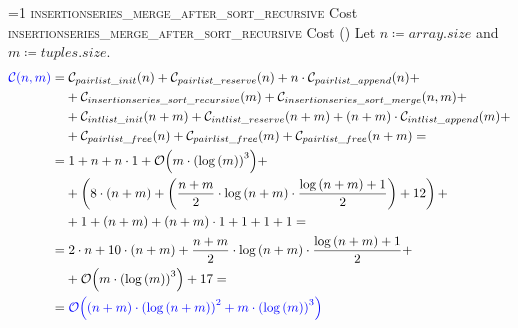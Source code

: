 \setcounter{insertionseriesmergeaftersortrecursivecostcounter}{1}
\newcommand{\insertionseriesmergeaftersortrecursivecostframe}{%
    \ifnum\value{insertionseriesmergeaftersortrecursivecostcounter}=1
        \textsc{insertionseries\_merge\_after\_sort\_recursive} Cost%
    \else
        \textsc{insertionseries\_merge\_after\_sort\_recursive} Cost (\theinsertionseriesmergeaftersortrecursivecostcounter)%
    \fi
}
        \begin{frame}{\insertionseriesmergeaftersortrecursivecostframe}
            \scriptsize
            Let $n \coloneqq array.size$ and $m \coloneqq tuples.size$.
            \begin{align*}
                \textcolor{blue}{\mathcal{C}{\left(n, m\right)}} = & \; \mathcal{C}_{pairlist\_init}{\left(n\right)} + \mathcal{C}_{pairlist\_reserve}{\left(n\right)} + n \cdot \mathcal{C}_{pairlist\_append}{\left(n\right)} + \\
                & + \mathcal{C}_{insertionseries\_sort\_recursive}{\left(m\right)} + \mathcal{C}_{insertionseries\_sort\_merge}{\left(n, m\right)} + \\
                & + \mathcal{C}_{intlist\_init}{\left(n + m\right)} + \mathcal{C}_{intlist\_reserve}{\left(n + m\right)} + \left(n + m\right) \cdot \mathcal{C}_{intlist\_append}{\left(m\right)} + \\
                & + \mathcal{C}_{pairlist\_free}{\left(n\right)} + \mathcal{C}_{pairlist\_free}{\left(m\right)} + \mathcal{C}_{pairlist\_free}{\left(n + m\right)} = \\
                = & \; 1 + n + n \cdot 1 + \mathcal{O}{\left(m \cdot \left(\log{\left(m\right)}\right)^3\right)} + \\
                & + \left(8 \cdot \left(n + m\right) + \left(\frac{n + m}{2} \cdot \log{\left(n + m\right)} \cdot \frac{\log{\left(n + m\right)} + 1}{2}\right) + 12\right) + \\
                & + 1 + \left(n + m\right) + \left(n + m\right) \cdot 1 + 1 + 1 + 1 = \\
                = & \; 2 \cdot n + 10 \cdot \left(n + m\right) + \frac{n + m}{2} \cdot \log{\left(n + m\right)} \cdot \frac{\log{\left(n + m\right)} + 1}{2} + \\
                & + \mathcal{O}{\left(m \cdot \left(\log{\left(m\right)}\right)^3\right)} + 17 = \\
                = & \; \textcolor{blue}{\mathcal{O}{\left(\left(n + m\right) \cdot \left(\log{\left(n + m\right)}\right)^2 + m \cdot \left(\log{\left(m\right)}\right)^3\right)}}
            \end{align*}
        \end{frame}

